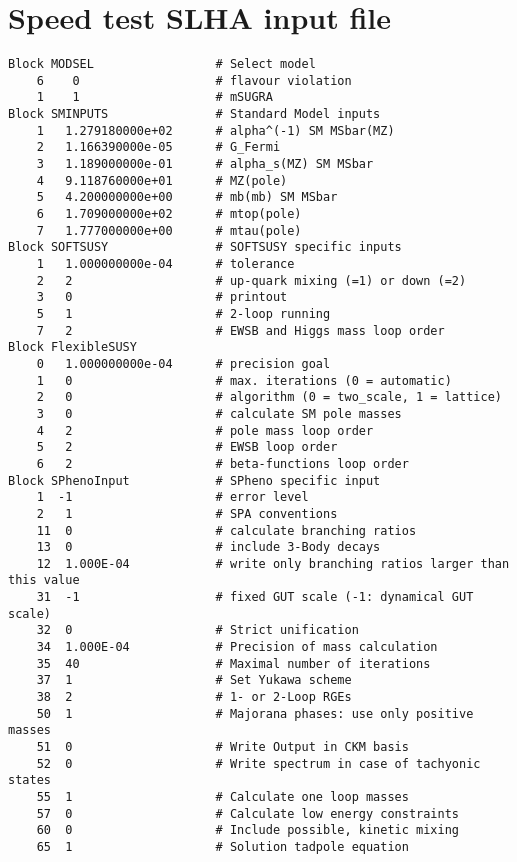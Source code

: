 \documentclass[final,3p,11pt,pdflatex]{elsarticle}
\begin{document}
\section{Speed test SLHA input file}
\label{sec:speed-test-slha-template-file}
%
\begin{lstlisting}
Block MODSEL                 # Select model
    6    0                   # flavour violation
    1    1                   # mSUGRA
Block SMINPUTS               # Standard Model inputs
    1   1.279180000e+02      # alpha^(-1) SM MSbar(MZ)
    2   1.166390000e-05      # G_Fermi
    3   1.189000000e-01      # alpha_s(MZ) SM MSbar
    4   9.118760000e+01      # MZ(pole)
    5   4.200000000e+00      # mb(mb) SM MSbar
    6   1.709000000e+02      # mtop(pole)
    7   1.777000000e+00      # mtau(pole)
Block SOFTSUSY               # SOFTSUSY specific inputs
    1   1.000000000e-04      # tolerance
    2   2                    # up-quark mixing (=1) or down (=2)
    3   0                    # printout
    5   1                    # 2-loop running
    7   2                    # EWSB and Higgs mass loop order
Block FlexibleSUSY
    0   1.000000000e-04      # precision goal
    1   0                    # max. iterations (0 = automatic)
    2   0                    # algorithm (0 = two_scale, 1 = lattice)
    3   0                    # calculate SM pole masses
    4   2                    # pole mass loop order
    5   2                    # EWSB loop order
    6   2                    # beta-functions loop order
Block SPhenoInput            # SPheno specific input
    1  -1                    # error level
    2   1                    # SPA conventions
    11  0                    # calculate branching ratios
    13  0                    # include 3-Body decays
    12  1.000E-04            # write only branching ratios larger than this value
    31  -1                   # fixed GUT scale (-1: dynamical GUT scale)
    32  0                    # Strict unification
    34  1.000E-04            # Precision of mass calculation
    35  40                   # Maximal number of iterations
    37  1                    # Set Yukawa scheme
    38  2                    # 1- or 2-Loop RGEs
    50  1                    # Majorana phases: use only positive masses
    51  0                    # Write Output in CKM basis
    52  0                    # Write spectrum in case of tachyonic states
    55  1                    # Calculate one loop masses
    57  0                    # Calculate low energy constraints
    60  0                    # Include possible, kinetic mixing
    65  1                    # Solution tadpole equation

\end{lstlisting}
\end{document}
